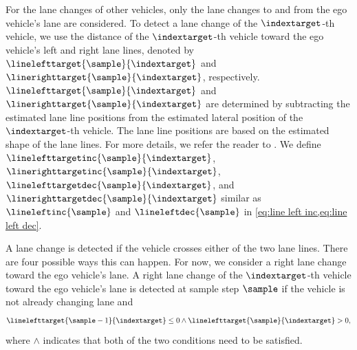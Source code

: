 For the lane changes of other vehicles, only the lane changes to and from the ego vehicle's lane are considered.
To detect a lane change of the $\indextarget$-th vehicle, we use the distance of the $\indextarget$-th vehicle toward the ego vehicle's left and right lane lines, denoted by $\linelefttarget{\sample}{\indextarget}$ and $\linerighttarget{\sample}{\indextarget}$, respectively.
$\linelefttarget{\sample}{\indextarget}$ and $\linerighttarget{\sample}{\indextarget}$ are determined by subtracting the estimated lane line positions from the estimated lateral position of the $\indextarget$-th vehicle. 
The lane line positions are based on the estimated shape of the lane lines. 
For more details, we refer the reader to \autocite{elfring2016effective}.
We define $\linelefttargetinc{\sample}{\indextarget}$, $\linerighttargetinc{\sample}{\indextarget}$, $\linelefttargetdec{\sample}{\indextarget}$, and $\linerighttargetdec{\sample}{\indextarget}$ similar as $\lineleftinc{\sample}$ and $\lineleftdec{\sample}$ in \cref{eq:line left inc,eq:line left dec}.

A lane change is detected if the vehicle crosses either of the two lane lines.
There are four possible ways this can happen.
For now, we consider a right lane change toward the ego vehicle's lane.
A right lane change of the $\indextarget$-th vehicle toward the ego vehicle's lane is detected at sample step $\sample$ if the vehicle is not already changing lane and
\begin{equation}
	\label{eq:detect lane change target}
	\linelefttarget{\sample-1}{\indextarget} \leq 0 \land \linelefttarget{\sample}{\indextarget} > 0,
\end{equation}
where $\land$ indicates that both of the two conditions need to be satisfied.


